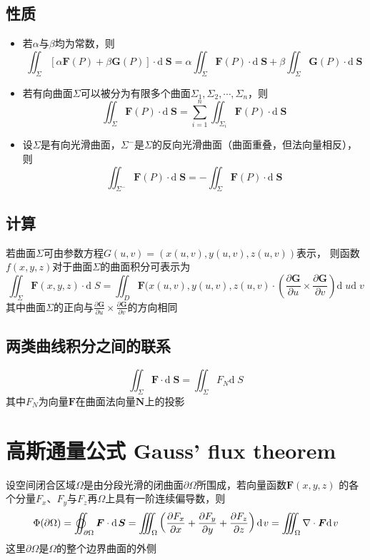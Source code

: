 \documentclass[UTF8]{ctexart}
\newcommand{\cross}{\times}
\newcommand{\dif}[1]{{\mathrm{d}\;\!#1}}
\newcommand{\ve}[1]{{\bm{#1}}}
\begin{document}
\subsection*{性质}
\begin{itemize}
  \item 若$\alpha$与$\beta$均为常数，则
  \[\iint_\Sigma[\alpha\ve{F}(P)+\beta\ve{G}(P)]\cdot\dif{\ve{S}}=\alpha\iint_\Sigma\ve{F}(P)\cdot\dif{\ve{S}}+\beta\iint_\Sigma\ve{G}(P)\cdot\dif{\ve{S}}\]
  \item 若有向曲面$\Sigma$可以被分为有限多个曲面$\Sigma_1,\Sigma_2,\cdots,\Sigma_n$，则
  \[ \iint_\Sigma\ve{F}(P)\cdot\dif{\ve{S}}=\sum^n_{i=1}\iint_{\Sigma_i} \ve{F}(P)\cdot\dif{\ve{S}} \]
  \item 设$\Sigma$是有向光滑曲面，$\Sigma^-$是$\Sigma$的反向光滑曲面（曲面重叠，但法向量相反），则
  \[\iint_{\Sigma^-} \ve{F}(P)\cdot\dif{\ve{S}}=-\iint_{\Sigma} \ve{F}(P)\cdot\dif{\ve{S}}\]
\end{itemize}

\subsection*{计算}
若曲面$\Sigma$可由参数方程$G(u,v)=\left( x(u,v),y(u,v),z(u,v) \right)$表示，
则函数$f(x,y,z)$对于曲面$\Sigma$的曲面积分可表示为
\[\iint_\Sigma \ve{F}(x,y,z)\cdot\dif{S}=\iint_D \ve{F}(x(u,v),y(u,v),z(u,v)\cdot\left({\frac{\partial \ve{G}}{\partial u}\cross\frac{\partial \ve{G}}{\partial v}}\right)\dif{u}\dif{v}\]
其中曲面$\Sigma$的正向与$\frac{\partial \ve{G}}{\partial u}\cross\frac{\partial \ve{G}}{\partial v}$的方向相同

\subsection*{两类曲线积分之间的联系}
\[\iint_\Sigma\ve{F}\cdot\dif{\ve{S}}=\iint_\Sigma F_N\dif{S}\]
其中$F_N$为向量$\ve{F}$在曲面法向量$\ve{N}$上的投影

\section*{高斯通量公式 Gauss' flux theorem}
设空间闭合区域$\Omega$是由分段光滑的闭曲面$\partial\Omega$所围成，若向量函数$\ve{F}(x,y,z)$
的各个分量$F_x$、$F_y$与$F_z$再$\Omega$上具有一阶连续偏导数，则
\[\Phi(\partial\Omega)=
\varoiint_{\partial\Omega}\ve{F}\cdot\dif{\ve{S}}=
\iiint_\Omega \left(\frac{\partial F_x}{\partial x}+\frac{\partial F_y}{\partial y}+\frac{\partial F_z}{\partial z}\right)\dif{v}=
\iiint_\Omega \nabla\cdot\ve{F}\dif{v}
\]
这里$\partial\Omega$是$\Omega$的整个边界曲面的外侧
\end{document}
